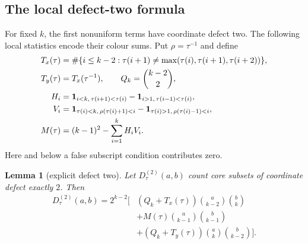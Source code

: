 \documentclass[11pt,letterpaper]{article}
\newtheorem{lemma}[theorem]{Lemma}
\begin{document}
\subsection{The local defect-two formula}

For fixed $k$, the first nonuniform terms have coordinate defect two.
The following local statistics encode their colour sums. Put
$\rho=\tau^{-1}$ and define
\[
\begin{aligned}
 T_x(\tau)&=\#\{i\leq k-2:\tau(i+1)\neq
       \max(\tau(i),\tau(i+1),\tau(i+2))\},\\
 T_y(\tau)&=T_x(\tau^{-1}),\qquad Q_k=\binom{k-2}{2},\\
 H_i&={\bf1}_{i<k,\,\tau(i+1)<\tau(i)}
      -{\bf1}_{i>1,\,\tau(i-1)<\tau(i)},\\
 V_i&={\bf1}_{\tau(i)<k,\,\rho(\tau(i)+1)<i}
      -{\bf1}_{\tau(i)>1,\,\rho(\tau(i)-1)<i},\\
 M(\tau)&=(k-1)^2-\sum_{i=1}^kH_iV_i.
\end{aligned}
\]
Here and below a false subscript condition contributes zero.

\begin{lemma}[explicit defect two]\label{lem:defect-two}
Let $D^{(2)}_\tau(a,b)$ count core subsets of coordinate defect exactly
$2$.  Then
\[
\begin{aligned}
 D^{(2)}_\tau(a,b)=2^{k-2}\bigg[&
  (Q_k+T_x(\tau))\binom a{k-2}\binom bk\\
 &+M(\tau)\binom a{k-1}\binom b{k-1}\\
 &+(Q_k+T_y(\tau))\binom ak\binom b{k-2}\bigg].
\end{aligned}
\]
\end{lemma}
\end{document}
